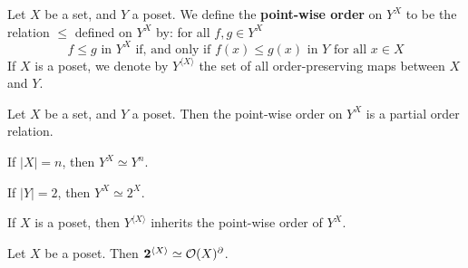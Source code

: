\begin{definition}
  Let $X$ be a set, and $Y$ a poset. We define the \textbf{point-wise
  order} on $Y^X$ to be the relation $\leq$ defined on $Y^X$ by: for
  all  $f,g \in Y^X$
  \begin{equation*}
    f \leq g \text{ in } Y^X \text{ if, and only if }
    f(x) \leq g(x) \text{ in } Y \text{ for all } x \in X
  \end{equation*}
  If $X$ is a poset, we denote by  $Y^{\langle X \rangle}$ the set of
  all order-preserving maps between $X$ and $Y$.
\end{definition}

\begin{proposition}\label{proposition_1.7.4}
  Let $X$ be a set, and $Y$ a poset. Then the point-wise order on
  $Y^X$ is a partial order relation.
\end{proposition}
\begin{corollary}
  If $|X|=n$, then  $Y^X \simeq Y^n$.
\end{corollary}
\begin{corollary}
  If $|Y|=2$, then $Y^X \simeq 2^X$.
\end{corollary}
\begin{corollary}
  If $X$ is a poset, then $Y^{\langle X \rangle}$ inherits the
  point-wise order of $Y^X$.
\end{corollary}

\begin{proposition}\label{proposition_1.7.5}
  Let $X$ be a poset. Then $\mathbf{2}^{\langle X \rangle} \simeq
  \mathcal{O}(X)^\partial$.
\end{proposition}
